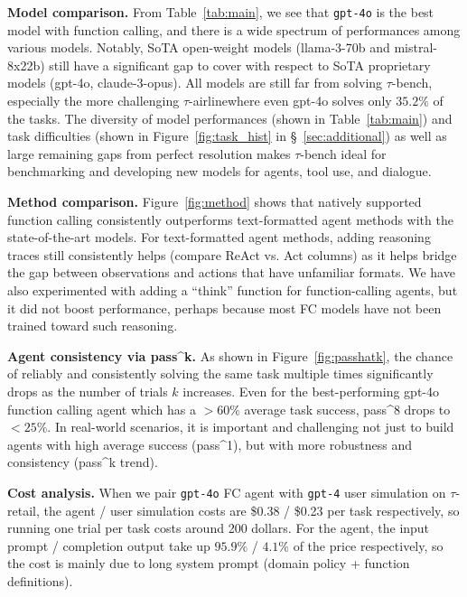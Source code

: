 \documentclass{article}
\newcommand{\benchmark}{$\tau$-bench}
\newcommand{\retail}{$\tau$-retail}  %
\newcommand{\airline}{$\tau$-airline}
\begin{document}
\textbf{Model comparison.} From Table~\ref{tab:main}, we see that \texttt{gpt-4o} is the best model with function calling, and there is a wide spectrum of performances among various models. Notably, SoTA open-weight models (llama-3-70b and mistral-8x22b) still have a significant gap to cover with respect to SoTA proprietary models (gpt-4o, claude-3-opus). All models are still far from solving \benchmark{}, especially the more challenging \airline where even gpt-4o solves only $35.2\%$ of the tasks. 
The diversity of model performances (shown in Table~\ref{tab:main}) and task difficulties (shown in Figure~\ref{fig:task_hist} in \S~\ref{sec:additional}) as well as large remaining gaps from perfect resolution makes \benchmark{} ideal for benchmarking and developing new models for agents, tool use, and dialogue.

\textbf{Method comparison.} Figure~\ref{fig:method} shows that natively supported function calling consistently outperforms text-formatted agent methods with the state-of-the-art models. For text-formatted agent methods, adding reasoning traces still consistently helps (compare ReAct vs. Act columns) as it helps bridge the gap between observations and actions that have unfamiliar formats. We have also experimented with adding a ``think'' function for function-calling agents, but it did not boost performance, perhaps because most FC models have not been trained toward such reasoning.%

\textbf{Agent consistency via pass\textasciicircum k.} As shown in Figure~\ref{fig:passhatk}, the chance of reliably and consistently solving the same task multiple times significantly drops as the number of trials $k$ increases. Even for the best-performing gpt-4o function calling agent which has a $>60\%$ average task success, pass\textasciicircum 8 drops to $<25\%$. In real-world scenarios, it is important and challenging not just to build agents with high average success (pass\textasciicircum 1), but with more robustness and consistency (pass\textasciicircum k trend).

\textbf{Cost analysis.} When we pair \texttt{gpt-4o} FC agent with \texttt{gpt-4} user simulation on \retail{}, the agent / user simulation costs are \$0.38 / \$0.23 per task respectively, so running one trial per task costs around 200 dollars. For the agent, the input prompt / completion output take up $95.9\%$ / $4.1\%$ of the price respectively, so the cost is mainly due to long system prompt (domain policy + function definitions). 
\end{document}
